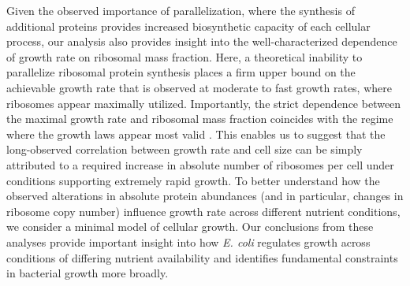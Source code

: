 Given the observed importance of parallelization, where the synthesis of
additional proteins provides increased biosynthetic capacity of each cellular
process, our analysis also provides insight into the well-characterized
dependence of growth rate on ribosomal mass fraction. Here, a theoretical
inability to parallelize ribosomal protein synthesis places a firm upper bound on the
achievable growth rate that is observed at moderate to fast growth
rates, where ribosomes appear maximally utilized. Importantly, the strict
dependence between the maximal growth rate and ribosomal mass fraction coincides
with the regime where the growth laws appear most valid \citep{amir2017,
scott2010}. This enables us to suggest that the long-observed correlation
between growth rate and cell size \citep{schaechter1958, si2017} can be simply
attributed to a required increase in absolute number of ribosomes per cell under
conditions supporting extremely rapid growth. To better understand how the
observed alterations in absolute protein abundances (and in particular, changes
in ribosome copy number) influence growth rate across different nutrient
conditions, we consider a minimal model of cellular growth. Our conclusions from
these analyses provide important insight into how \textit{E. coli} regulates
growth across conditions of differing nutrient availability and identifies
fundamental constraints in bacterial growth more broadly.


